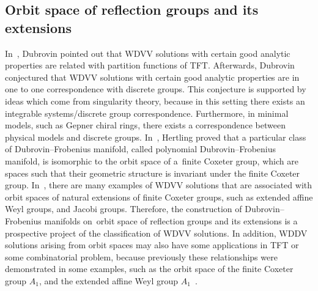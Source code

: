 \documentclass[pdftex]{sigma}%
\numberwithin{equation}{section}
\begin{document}
\subsection{Orbit space of reflection groups and its extensions}
In~\cite{B.Dubrovin2}, Dubrovin pointed out that WDVV solutions with certain good analytic properties are rela\-ted with partition functions of TFT. Afterwards, Dubrovin conjectured that WDVV solutions with certain good analytic properties are in one to one correspondence with discrete groups. This conjecture is supported by ideas which come from singularity theory, because in this setting there exists an integrable systems/discrete group correspondence. Furthermore, in minimal models, such as Gepner chiral rings, there exists a correspondence between physical models and discrete groups.
In~\cite{C.Hertling}, Hertling proved that a particular class of Dubrovin--Frobenius manifold, called polynomial Dubrovin--Frobenius manifold, is isomorphic to the orbit space of a~finite Coxeter group, which are spaces such that their geometric structure is invariant under the finite Coxeter group.
In~\cite{BertolaM.1,BertolaM.2, B.Dubrovin2, B.Dubrovin1, B.DubrovinI.A.B.StrachanY.ZhangD.Zuo, B.DubrovinandY.Zhang, D.Zuo}, there are many examples of WDVV solutions that are associated with orbit spaces of natural extensions of finite Coxeter groups, such as
extended affine Weyl groups, and Jacobi groups. Therefore, the construction of Dubrovin--Frobenius manifolds on~orbit space of reflection groups and its extensions is a prospective project of the classification of WDVV solutions. In addition, WDDV solutions arising from orbit spaces may also have some applications in TFT or some combinatorial problem, because previously these relationships were demonstrated in some examples, such as the orbit space of the finite Coxeter group $A_1$, and the extended affine Weyl group $A_1$~\cite{Dubrovin3,B.DubrovinandY.Zhang2}.
\end{document}
